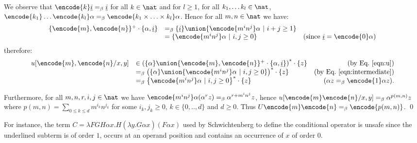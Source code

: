 We observe that $\encode{k} \underline{i} =_\beta \underline{i}$ for
all $k \in \nat$ and for $l\geq 1$, for all $k_1, \ldots k_l \in
\nat$, $\encode{k_1}\ldots \encode{k_l} \alpha =_\beta
\encode{k_1\times \ldots \times k_l} \alpha$. Hence for all $m,n \in
\nat$ we have:
\begin{equation}
\begin{array}{llr}
\{\encode{m},\encode{n}\}^+ \cdot \{\alpha, \underline{i} \} &=_\beta
\{ \underline{i} \} \union
\{ \encode{m^i n^j} \alpha \ |\ i+j \geq 1 \} \nonumber \\
&= \{ \encode{m^i n^j} \alpha \ |\ i,j \geq 0 \} & ( \mbox{since } \underline{i} = \encode{0} \alpha) \end{array}
\label{eqn:intermediate}
\end{equation}
therefore:
$$\begin{array}{llr}
u[\encode{m}, \encode{n}/x,y] &\in \left( \{ \alpha \} \union \{\encode{m},\encode{n}\}^+ \cdot \{\alpha, \underline{i} \} \right)^* \cdot \{ z \}  & \mbox{(by Eq.\ \ref{eqn:u})} \\
&=_\beta \left( \{\alpha \} \union \{ \encode{m^i n^j}
\alpha \ | \ i,j \geq 0 \} \right)^* \cdot \{ z \} & \mbox{(by Eq.\ \ref{eqn:intermediate})}  \\
&=_\beta \left\{ \encode{m^i n^j}
\alpha \ | \ i,j \geq 0 \right\}^* \cdot \{ z \} & \mbox{($\alpha z =_\beta \encode{1} \alpha z$)}.
\end{array}$$

Furthermore, for all $m,n,r,i,j\in \nat$ we have $\encode{m^i n^j}
\alpha (\alpha^r z) =_\beta \alpha^{r + m^i n^j} z$, hence
$u[\encode{m} \encode{n}/x,y] =_\beta \alpha^{p(m,n)} z$ where
$p(m,n) = \sum_{0\leq k \leq d} m^{i_k} n^{j_k}$ for some $i_k,j_k
\geq 0$, $k \in\{ 0,..,d \}$ and $d\geq 0$. Thus $U \encode{m}
\encode{n} =_\beta \encode{p(m,n)}$. \qed


For instance, the term $ C = \lambda F G H \alpha x . H (
\underline{\lambda y . G \alpha x} ) (F \alpha x)$ used by
Schwichtenberg \cite{citeulike:622637} to define the conditional
operator is unsafe since the underlined subterm is of order $1$,
occurs at an operand position and contains an occurrence of $x$ of
order $0$.
